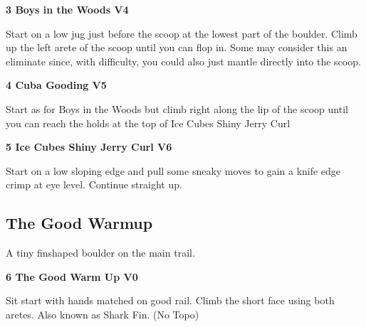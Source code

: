 \begin{multicols}{2}

					\begin{minipage}{\linewidth}	
					\label{rt:Boys in the Woods}
\colorbox{RoyalBlue!20}{
\textbf{
3 Boys in the Woods V4    
}
}

					\begin{adjustwidth}{0.5cm}{}				
					Start on a low jug just before the scoop at the lowest part of the boulder. Climb up the left arete of the scoop until you can flop in. Some may consider this an eliminate since, with difficulty, you could also just mantle directly into the scoop.
					\end{adjustwidth}
					\end{minipage}
					\begin{minipage}{\linewidth}	
					\label{rt:Cuba Gooding}
\colorbox{RoyalBlue!20}{
\textbf{
4 Cuba Gooding V5  
}
}

					\begin{adjustwidth}{0.5cm}{}				
					Start as for Boys in the Woods but climb right along the lip of the scoop until you can reach the holds at the top of Ice Cubes Shiny Jerry Curl
					\end{adjustwidth}
					\end{minipage}
					\begin{minipage}{\linewidth}	
					\label{rt:Ice Cubes Shiny Jerry Curl}
\colorbox{RoyalBlue!20}{
\textbf{
5 Ice Cubes Shiny Jerry Curl V6  
}
}

					\begin{adjustwidth}{0.5cm}{}				
					Start on a low sloping edge and pull some sneaky moves to gain a knife edge crimp at eye level. Continue straight up.
					\end{adjustwidth}
					\end{minipage}
			\subsection*{The Good Warmup}\label{bf:The Good Warmup}
			\begin{minipage}{\columnwidth}
			A tiny finshaped boulder on the main trail.
			\end{minipage}
			
					\begin{minipage}{\linewidth}	
					\label{rt:The Good Warm Up}
\colorbox{green!20}{
\textbf{
6 The Good Warm Up V0   
}
}

					\begin{adjustwidth}{0.5cm}{}				
					Sit start with hands matched on good rail. Climb the short face using both aretes. Also known as Shark Fin.
						\newline (No Topo) 
					\end{adjustwidth}
					\end{minipage}

\end{multicols}
